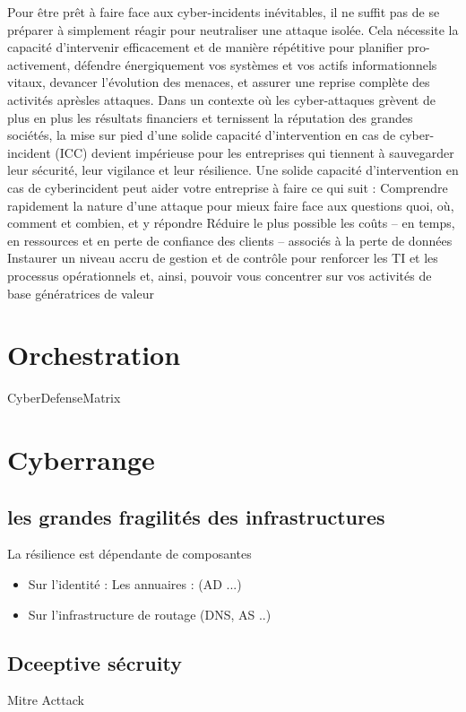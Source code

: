 



Pour être prêt à faire face aux cyber-incidents inévitables, il ne suffit pas de se préparer à simplement réagir pour neutraliser une attaque isolée. Cela nécessite la capacité d’intervenir efficacement et de manière répétitive pour planifier pro-activement, défendre énergiquement vos systèmes et vos actifs informationnels vitaux, devancer l’évolution des menaces, et assurer une reprise complète des activités aprèsles attaques.
Dans un contexte où les cyber-attaques grèvent de plus en plus les résultats financiers et ternissent la réputation des grandes sociétés, la mise sur pied d’une solide capacité d’intervention en cas de cyber-incident (ICC) devient impérieuse pour les entreprises qui tiennent à sauvegarder leur sécurité, leur vigilance et leur résilience. Une solide capacité d’intervention en cas de cyberincident peut aider votre entreprise à faire ce qui suit :
Comprendre rapidement la nature d’une attaque pour mieux faire face aux questions quoi, où, comment et combien, et y répondre
Réduire le plus possible les coûts – en temps, en ressources et en perte de confiance des clients – associés à la perte de données
Instaurer un niveau accru de gestion et de contrôle pour renforcer les TI et les processus opérationnels et, ainsi, pouvoir vous concentrer sur vos activités de base génératrices de valeur

\section{Orchestration}

CyberDefenseMatrix  \cite{dutta2019cyber}

\section{Cyberrange}



\subsection {les grandes fragilités des infrastructures}

La résilience est dépendante de composantes 
\begin{itemize}
  \item Sur l'identité : Les annuaires : (AD ...)
  \item Sur l'infrastructure de routage (DNS, AS ..)
\end{itemize}

\subsection {Dceeptive sécruity}
Mitre Acttack


